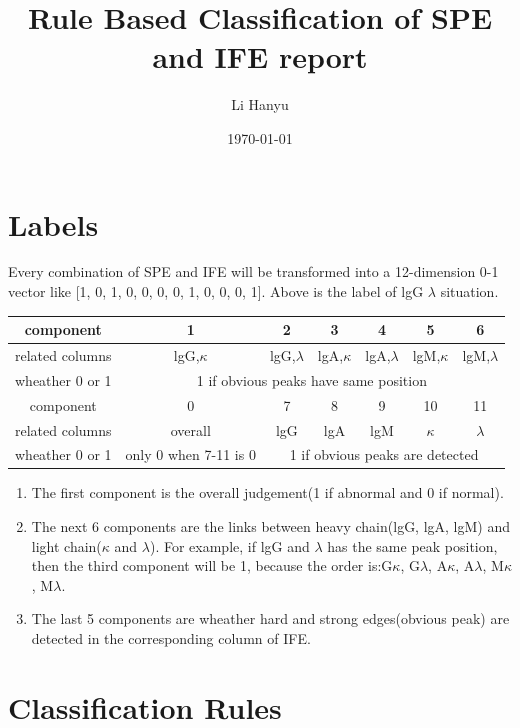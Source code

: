 \documentclass[12pt]{ctexart}
\title{Rule Based Classification of SPE and IFE report}
\author{Li Hanyu}
\date{\today}
\begin{document}
\maketitle
\newpage
\section{Labels}
\par Every combination of SPE and IFE will be transformed into a 12-dimension 0-1 vector like [1, 0, 1, 0, 0, 0, 0, 1, 0, 0, 0, 1]. Above is the label of lgG $\lambda$ situation.

\begin{tabular}{|c|c|c|c|c|c|c|}
    \hline
    component&1&2&3&4&5&6\\
    \hline
    related columns&lgG,$\kappa$&lgG,$\lambda$&lgA,$\kappa$&lgA,$\lambda$&lgM,$\kappa$&lgM,$\lambda$\\
    \hline
    wheather 0 or 1&\multicolumn{6}{|c|}{1 if obvious peaks have same position}\\
    \hline
    \hline
    component&0&7&8&9&10&11\\
    \hline
    related columns&overall&lgG&lgA&lgM&$\kappa$&$\lambda$\\
    \hline
    wheather 0 or 1&only 0 when 7-11 is 0&\multicolumn{5}{|c|}{1 if obvious peaks are detected}\\
    \hline
    \end{tabular}
\begin{enumerate}
    \item The first component is the overall judgement(1 if abnormal and 0 if normal).
    \item The next 6 components are the links between heavy chain(lgG, lgA, lgM) and light chain($\kappa$ and $\lambda$). For example, if lgG and $\lambda$ has the same peak position, then the third component will be 1, because the order is:G$\kappa$, G$\lambda$, A$\kappa$, A$\lambda$, M$\kappa$, M$\lambda$.
    \item The last 5 components are wheather hard and strong edges(obvious peak) are detected in the corresponding column of IFE.
\end{enumerate}
\section{Classification Rules}
\end{document}
